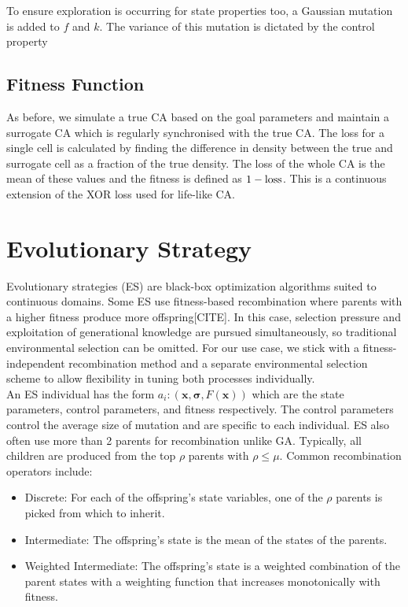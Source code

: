 To ensure exploration is occurring for state properties too, a Gaussian mutation is added to $f$ and $k$. The variance of this mutation is dictated by the control property 

\subsection{Fitness Function}
As before, we simulate a true CA based on the goal parameters and maintain a surrogate CA which is regularly synchronised with the true CA. The loss for a single cell is calculated by finding the difference in density between the true and surrogate cell as a fraction of the true density. The loss of the whole CA is the mean of these values and the fitness is defined as $1 - \textnormal{loss}$. This is a continuous extension of the XOR loss used for life-like CA.\\

\section{Evolutionary Strategy}
Evolutionary strategies (ES) are black-box optimization algorithms suited to continuous domains. Some ES use fitness-based recombination where parents with a higher fitness produce more offspring[CITE]. In this case, selection pressure and exploitation of generational knowledge are pursued simultaneously, so traditional environmental selection can be omitted. For our use case, we stick with a fitness-independent recombination method and a separate environmental selection scheme to allow flexibility in tuning both processes individually.\\

An ES individual has the form $a_i: (\bm{x}, \bm{\sigma}, F(\bm{x}))$ which are the state parameters, control parameters, and fitness respectively. The control parameters control the average size of mutation and are specific to each individual. ES also often use more than 2 parents for recombination unlike GA. Typically, all children are produced from the top $\rho$ parents with $\rho \leq \mu$. Common recombination operators include:
\begin{itemize}
  \item Discrete: For each of the offspring's state variables, one of the $\rho$ parents is picked from which to inherit.
  \item Intermediate: The offspring's state is the mean of the states of the parents.
  \item Weighted Intermediate: The offspring's state is a weighted combination of the parent states with a weighting function that increases monotonically with fitness.
\end{itemize}

